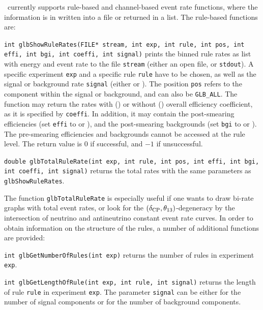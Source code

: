 \GLOBES\ currently supports rule-based and channel-based event rate functions, where the information is in written into a file
or returned in a list. The rule-based functions are:
\begin{function}
{\tt int glbShowRuleRates(FILE* stream, int exp, int rule, int pos,
int effi, int bgi, int coeffi, int signal)} prints the binned rule rates as
list with energy and event rate to the file {\tt stream} (either an
open file, or {\tt stdout}). A specific experiment {\tt exp} and a 
specific rule {\tt rule} have to be chosen, as well as the signal
or background rate {\tt signal} (either  or ).
The position {\tt pos} refers to the component within the signal or 
background, and can also be {\tt GLB\_ALL}. The function may return
the rates with () or without ()
overall efficiency coefficient, as it is specified by {\tt coeffi}. 
In addition, it may contain the post-smearing efficiencies (set
{\tt effi} to  or ), and the
post-smearing backgrounds (set
{\tt bgi} to  or ). The pre-smearing
efficiencies and backgrounds cannot be accessed at the rule level.
The return value
is $0$ if successful, and $-1$ if unsuccessful.
\end{function}
\begin{function}
{\tt double glbTotalRuleRate(int exp, int rule, int pos,
int effi, int bgi, int coeffi, int signal)} returns the total rates with
the same parameters as {\tt glbShowRuleRates}.
\end{function}
The function {\tt glbTotalRuleRate} is especially useful if
one wants to draw bi-rate graphs with total event rates, or look
for the $(\delta_{\mathrm{CP}},\theta_{13})$-degeneracy by the intersection of 
neutrino and antineutrino constant event rate curves.
%
In order to obtain information on the structure of the rules, 
a number of additional functions are provided:
\begin{function}
{\tt int glbGetNumberOfRules(int exp)} returns the number of
rules in experiment {\tt exp}.
\end{function}
\begin{function}
{\tt int glbGetLengthOfRule(int exp, int rule, int signal)} returns
the length of rule {\tt rule} in experiment {\tt exp}. The parameter
{\tt signal} can be either  for the number of signal
components or  for the number of background components.
\end{function}
